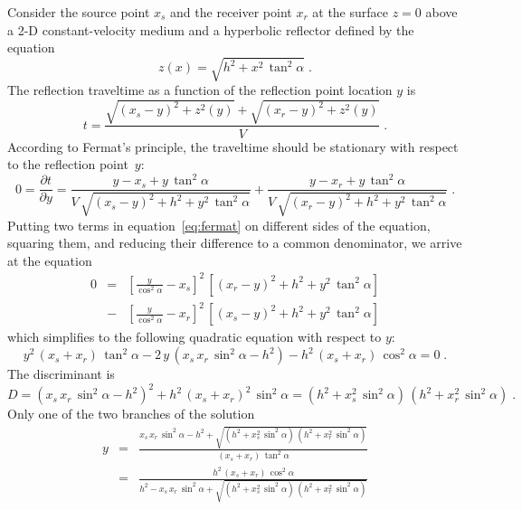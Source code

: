 
Consider the source point $x_s$ and the receiver point $x_r$ at the
surface $z=0$ above a 2-D constant-velocity medium and a hyperbolic
reflector  defined by the equation 
\begin{equation}
  \label{eq:hypref}
  z(x) = \sqrt{h^2 +
    x^2\,\tan^2{\alpha}}\;.
\end{equation}
The reflection traveltime as a function of the reflection point
location $y$ is
\begin{equation}
  \label{eq:tofy}
  t = \frac{\sqrt{(x_s-y)^2 + z^2(y)} + \sqrt{(x_r-y)^2+z^2(y)}}{V}\;.
\end{equation}
According to Fermat's principle, the traveltime should be stationary
with respect to the reflection point~$y$:
\begin{equation}
\label{eq:fermat}
0 = \frac{\partial t}{\partial y} =
\frac{y-x_s + y\,\tan^2{\alpha}}{V\,\sqrt{(x_s-y)^2 + h^2 + y^2\,\tan^2{\alpha}}} +
\frac{y-x_r + y\,\tan^2{\alpha}}{V\,\sqrt{(x_r-y)^2 + h^2 + y^2\,\tan^2{\alpha}}}\;.
\end{equation}
Putting two terms in equation~\ref{eq:fermat} on different sides of
the equation, squaring them, and reducing their difference to a common
denominator, we arrive at the equation
\begin{eqnarray}
\nonumber
0 & = & 
\left[\frac{y}{\cos^2{\alpha}} - x_s\right]^2\,\left[(x_r-y)^2 + h^2 + y^2\,\tan^2{\alpha}\right] \\
& - & 
\left[\frac{y}{\cos^2{\alpha}} - x_r\right]^2\,\left[(x_s-y)^2 + h^2 + y^2\,\tan^2{\alpha}\right] 
\label{eq:fermat2}
\end{eqnarray}
which simplifies to the following quadratic equation with respect to $y$:
\begin{equation}
  \label{eq:y2}
  y^2\,(x_s+x_r)\,\tan^2{\alpha} - 2\,y\,\left(x_s\,x_r\,\sin^2{\alpha} - h^2\right) -
  h^2\,(x_s+x_r)\,\cos^2{\alpha} = 0\;.
\end{equation}
The discriminant is
\begin{equation}
  \label{eq:disc}
  D = \left(x_s\,x_r\,\sin^2{\alpha}-h^2\right)^2 + h^2\,(x_s+x_r)^2\,\sin^2{\alpha}
  = (h^2+x_s^2\,\sin^2{\alpha})\,(h^2+x_r^2\,\sin^2{\alpha})\;.
\end{equation}
Only one of the two branches of the solution
\begin{eqnarray}
  \nonumber
  y & = & 
  \frac{x_s\,x_r\,\sin^2{\alpha}-h^2 + \sqrt{(h^2+x_s^2\,\sin^2{\alpha})\,(h^2+x_r^2\,\sin^2{\alpha})}}{(x_s+x_r)\,\tan^2{\alpha}} \\
  & = &
  \frac{h^2\,(x_s+x_r)\,\cos^2{\alpha}}{h^2 - x_s\,x_r\,\sin^2{\alpha} +
    \sqrt{(h^2+x_s^2\,\sin^2{\alpha})\,(h^2+x_r^2\,\sin^2{\alpha})}}
  \label{eq:ys}
\end{eqnarray}
